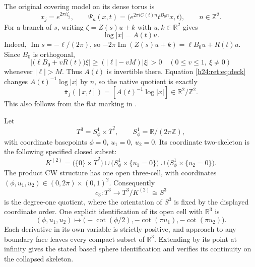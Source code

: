 The original covering model on its dense torus is
\begin{equation}
 x_j=e^{2\pi i\zeta_j},\qquad
 \Psi_n(x,t)=
 \bigl(e^{2\pi i C(t)n}t^{B_0n}x,t\bigr),\qquad n\in\mathbb Z^2.
 \label{h24:ret:eq:deck}
\end{equation}
For a branch of \(s\), writing
\(\zeta=Z(s)u+k\) with \(u,k\in\mathbb R^2\) gives
\begin{equation}
 \log|x|=A(t)u.
 \label{h24:ret:eq:logx}
\end{equation}
Indeed, \(\operatorname{Im}s=-\ell/(2\pi)\), so
\(-2\pi\operatorname{Im}(Z(s)u+k)=\ell B_0u+R(t)u\).
Since \(B_0\) is orthogonal,
\begin{equation}
 \bigl|\bigl(\ell B_0+vR(t)\bigr)\xi\bigr|
 \geq (|\ell|-vM)|\xi|>0
 \quad(0\leq v\leq1,\ \xi\ne0)
 \label{h24:ret:eq:invertibility}
\end{equation}
whenever \(|\ell|>M\).  Thus \(A(t)\) is invertible there.  Equation
\eqref{h24:ret:eq:deck} changes \(A(t)^{-1}\log|x|\) by \(n\), so the native
quotient is exactly
\begin{equation}
 \overline\pi_f([x,t])=[A(t)^{-1}\log|x|]\in\mathbb R^2/\mathbb Z^2.
 \label{h24:ret:eq:native}
\end{equation}
This also follows from the flat marking in \cite{h24:retbib:ConeRoutes}.

Let
\[
 T^3=S^1_\phi\times\overline T^2,
 \qquad S^1_\phi=\mathbb R/(2\pi\mathbb Z),
\]
with coordinate basepoints \(\phi=0\), \(u_1=0\), \(u_2=0\).
Its coordinate two-skeleton is the following specified closed subset:
\begin{equation}
 K^{(2)}=
 \bigl(\{0\}\times\overline T^2\bigr)
 \cup\bigl(S^1_\phi\times\{u_1=0\}\bigr)
 \cup\bigl(S^1_\phi\times\{u_2=0\}\bigr).
 \label{h24:ret:eq:two-skeleton}
\end{equation}
The product CW structure has one open three-cell, with coordinates
\((\phi,u_1,u_2)\in(0,2\pi)\times(0,1)^2\).  Consequently
\[
 c_3:T^3\longrightarrow T^3/K^{(2)}\cong S^3
\]
is the degree-one quotient, where the orientation of \(S^3\) is fixed
by the displayed coordinate order.  One explicit identification of its
open cell with \(\mathbb R^3\) is
\[
 (\phi,u_1,u_2)\longmapsto
 \bigl(-\cot(\phi/2),-\cot(\pi u_1),-\cot(\pi u_2)\bigr).
\]
Each derivative in its own variable is strictly positive, and approach
to any boundary face leaves every compact subset of \(\mathbb R^3\).
Extending by its point at infinity gives the stated based sphere
identification and verifies its continuity on the collapsed skeleton.

